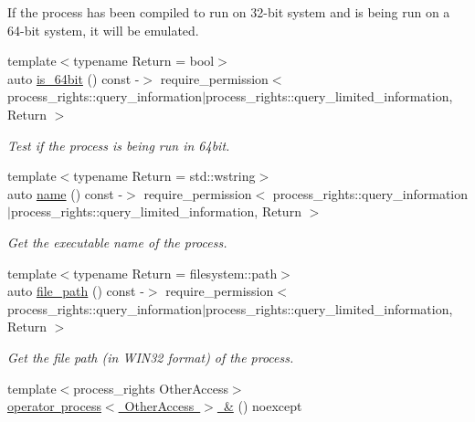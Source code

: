 \begin{DoxyCompactItemize}
\begin{DoxyCompactList}
 If the process has been compiled to run on 32-\/bit system and is being run on a 64-\/bit system, it will be emulated. \end{DoxyCompactList}\item 
{\footnotesize template$<$typename Return  = bool$>$ }\\auto \mbox{\hyperlink{classdistant_1_1kernel__objects_1_1process_a9fc52566aa890d371eaedf82ad7a4868}{is\+\_\+64bit}} () const -\/$>$ require\+\_\+permission$<$ process\+\_\+rights\+::query\+\_\+information$\vert$process\+\_\+rights\+::query\+\_\+limited\+\_\+information, Return $>$
\begin{DoxyCompactList}\small\item\em Test if the process is being run in 64bit. \end{DoxyCompactList}\item 
{\footnotesize template$<$typename Return  = std\+::wstring$>$ }\\auto \mbox{\hyperlink{classdistant_1_1kernel__objects_1_1process_a380d7b1f70e856105848af6a9ae60d88}{name}} () const -\/$>$ require\+\_\+permission$<$ process\+\_\+rights\+::query\+\_\+information$\vert$process\+\_\+rights\+::query\+\_\+limited\+\_\+information, Return $>$
\begin{DoxyCompactList}\small\item\em Get the executable name of the process. \end{DoxyCompactList}\item 
{\footnotesize template$<$typename Return  = filesystem\+::path$>$ }\\auto \mbox{\hyperlink{classdistant_1_1kernel__objects_1_1process_abf8afdafb3ff75722ea2660aac7a7b22}{file\+\_\+path}} () const -\/$>$ require\+\_\+permission$<$ process\+\_\+rights\+::query\+\_\+information$\vert$process\+\_\+rights\+::query\+\_\+limited\+\_\+information, Return $>$
\begin{DoxyCompactList}\small\item\em Get the file path (in W\+I\+N32 format) of the process. \end{DoxyCompactList}\item 
\mbox{\label{classdistant_1_1kernel__objects_1_1process_a2f6fbe7adb69ff892c305909545e15ab}} 
{\footnotesize template$<$process\+\_\+rights Other\+Access$>$ }\\\mbox{\hyperlink{classdistant_1_1kernel__objects_1_1process_a2f6fbe7adb69ff892c305909545e15ab}{operator process$<$ Other\+Access $>$ \&}} () noexcept

\end{DoxyCompactItemize}
